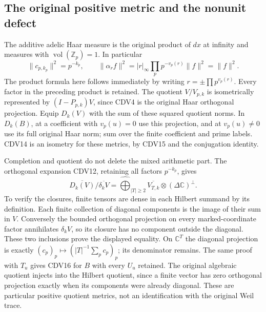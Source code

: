 \documentclass[11pt,a4paper]{article}
\theoremstyle{definition}\newtheorem{definition}[theorem]{Definition}
\begin{document}
\subsection{The original positive metric and the nonunit defect}

The additive adelic Haar measure is the original product of $dx$ at
infinity and measures with $\operatorname{vol}(\mathbb Z_p)=1$.
In particular
\begin{equation}\tag{CDV15}
 \|c_{p,k_p}\|^2=p^{-k_p},\qquad
 \|\alpha_rf\|^2=|r|_\infty\prod_p p^{-v_p(r)}\|f\|^2=\|f\|^2.
\end{equation}
The product formula here follows immediately by writing
$r=\pm\prod p^{v_p(r)}$. Every factor in the preceding product
is retained. The quotient $V/V_{p,k}$ is isometrically represented
by $(I-P_{p,k})V$, since CDV4 is the original Haar orthogonal
projection. Equip $D_k(V)$ with the sum of these squared quotient
norms. In $D_k(B)$, at a coefficient with $v_p(u)=0$ use this
projection, and at $v_p(u)\ne0$ use its full original Haar norm;
sum over the finite coefficient and prime labels. CDV14 is an
isometry for these metrics, by CDV15 and the conjugation identity.

Completion and quotient do not delete the mixed arithmetic part.
The orthogonal expansion CDV12, retaining all factors $p^{-k_p}$,
gives
\begin{equation}\tag{CDV16}
 \overline{D_k(V)}/\overline{\delta_kV}
 =\widehat{\bigoplus}_{|T|\ge2}\overline{V_{T,k}}
                  \otimes(\Delta\mathbb C)^\perp.
\end{equation}
To verify the closures, finite tensors are dense in each Hilbert
summand by its definition. Each finite collection of diagonal
components is the image of their sum in $V$. Conversely the
bounded orthogonal projection on every marked-coordinate factor
annihilates $\delta_kV$, so its closure has no component outside
the diagonal. These two inclusions prove the displayed equality.
On $\mathbb C^T$ the diagonal projection is exactly
$(c_p)_p\mapsto(|T|^{-1}\sum_pc_p)_p$; its denominator remains.
The same proof with $T_u$ gives CDV16 for $B$ with every $U_u$
retained. The original algebraic quotient injects into the Hilbert
quotient, since a finite vector has zero orthogonal projection
exactly when its components were already diagonal. These are
particular positive quotient metrics, not an identification with
the original Weil trace.
\end{document}
